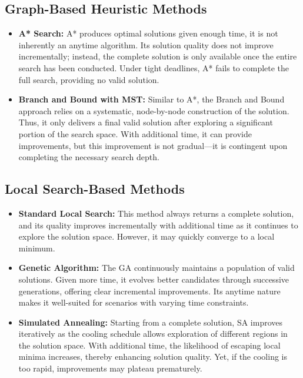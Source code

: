 \documentclass[11pt]{article}
\begin{document}
	\subsection{Graph-Based Heuristic Methods}
	\begin{itemize}[noitemsep]
		\item \textbf{A* Search:} A* produces optimal solutions given enough time, it is not inherently an anytime algorithm. Its solution quality does not improve incrementally; instead, the complete solution is only available once the entire search has been conducted. Under tight deadlines, A* fails to complete the full search, providing no valid solution.
		\item \textbf{Branch and Bound with MST:} Similar to A*, the Branch and Bound approach relies on a systematic, node-by-node construction of the solution. Thus, it only delivers a final valid solution after exploring a significant portion of the search space. With additional time, it can provide improvements, but this improvement is not gradual—it is contingent upon completing the necessary search depth.
	\end{itemize}
	
	\subsection{Local Search-Based Methods}
	\begin{itemize}[noitemsep]
		\item \textbf{Standard Local Search:} This method always returns a complete solution, and its quality improves incrementally with additional time as it continues to explore the solution space. However, it may quickly converge to a local minimum.
		\item \textbf{Genetic Algorithm:} The GA continuously maintains a population of valid solutions. Given more time, it evolves better candidates through successive generations, offering clear incremental improvements. Its anytime nature makes it well-suited for scenarios with varying time constraints.
		\item \textbf{Simulated Annealing:} Starting from a complete solution, SA improves iteratively as the cooling schedule allows exploration of different regions in the solution space. With additional time, the likelihood of escaping local minima increases, thereby enhancing solution quality. Yet, if the cooling is too rapid, improvements may plateau prematurely.
	\end{itemize}
	
\end{document}
